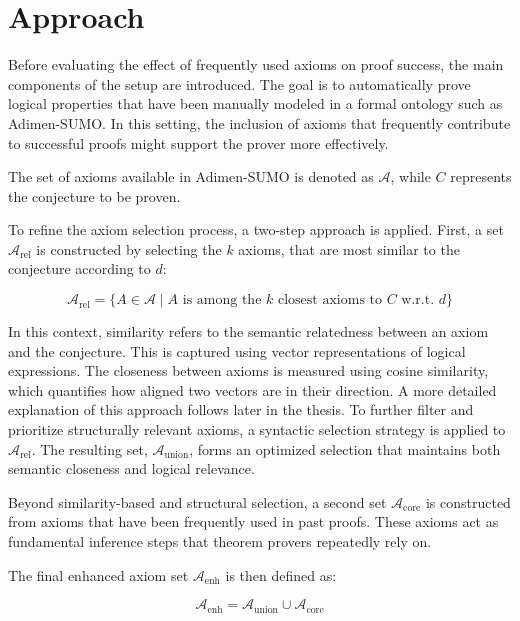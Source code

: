 \documentclass[english,version-2020-11]{uzl-thesis}
\begin{document}
\section{Approach}

Before evaluating the effect of frequently used axioms on proof success, the main components of the setup are introduced. The goal is to automatically prove logical properties that have been manually modeled in a formal ontology such as Adimen-SUMO. In this setting, the inclusion of axioms that frequently contribute to successful proofs might support the prover more effectively.

The set of axioms available in Adimen-SUMO is denoted as \( \mathcal{A} \), while \( C \) represents the conjecture to be proven.

To refine the axiom selection process, a two-step approach is applied. First, a set \( \mathcal{A}_{\text{rel}} \) is constructed by selecting the \( k \)  axioms, that are most similar to the conjecture according to \( d \):

\begin{equation}
    \mathcal{A}_{\text{rel}} = \{ A \in \mathcal{A} \mid A \text{ is among the } k \text{ closest axioms to } C \text{ w.r.t. } d \}
\end{equation}

In this context, similarity refers to the semantic relatedness between an axiom and the conjecture. This is captured using vector representations of logical expressions. The closeness between axioms is measured using cosine similarity, which quantifies how aligned two vectors are in their direction. A more detailed explanation of this approach follows later in the thesis.
To further filter and prioritize structurally relevant axioms, a syntactic selection strategy is applied to \( \mathcal{A}_{\text{rel}} \). The resulting set, \( \mathcal{A}_{\text{union}} \), forms an optimized selection that maintains both semantic closeness and logical relevance.

Beyond similarity-based and structural selection, a second set \( \mathcal{A}_{\text{core}} \) is constructed from axioms that have been frequently used in past proofs. These axioms act as fundamental inference steps that theorem provers repeatedly rely on.

The final enhanced axiom set \( \mathcal{A}_{\text{enh}} \) is then defined as:

\begin{equation}
    \mathcal{A}_{\text{enh}} = \mathcal{A}_{\text{union}} \cup \mathcal{A}_{\text{core}}
\end{equation}
\end{document}
